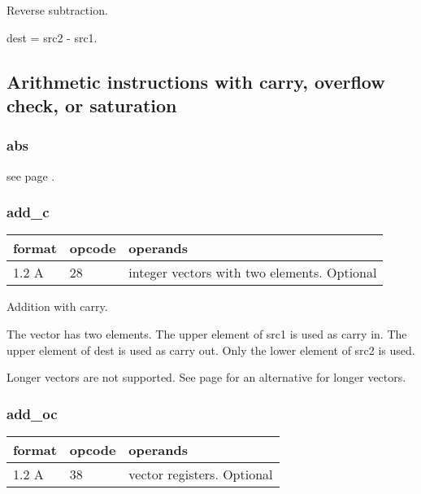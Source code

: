 \documentclass[forwardcom.tex]{subfiles}
\begin{document}
Reverse subtraction.
\vspace{2mm}

dest = src2 - src1.
\vspace{2mm}


\subsection{Arithmetic instructions with carry, overflow check, or saturation}

\subsubsection{abs}
see page \pageref{table:absInstruction}.
\vspace{2mm}


\subsubsection{add\_c}
\label{table:addCInstruction}
\begin{tabular}{|p{12mm}|p{12mm}|p{110mm}|}
\hline
\bfseries format & \bfseries opcode & \bfseries operands \\ \hline
1.2 A & 28 & integer vectors with two elements. Optional \\ \hline
\end{tabular}
\vspace{2mm}

Addition with carry.
\vspace{2mm}

The vector has two elements. The upper element of src1 is used as carry in. The upper element of dest is used as carry out. Only the lower element of src2 is used.
\vspace{2mm}

Longer vectors are not supported. See page 
\pageref{highPrecisionArithmetic} for an alternative for longer vectors.

\subsubsection{add\_oc}
\label{table:addOcInstruction}
\begin{tabular}{|p{12mm}|p{12mm}|p{110mm}|}
\hline
\bfseries format & \bfseries opcode & \bfseries operands \\ \hline
1.2 A & 38 & vector registers. Optional \\ \hline
\end{tabular}
\vspace{2mm}
\end{document}
